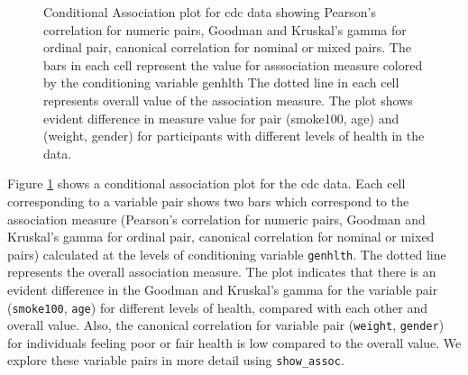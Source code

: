 \begin{Schunk}
\begin{figure}
\caption[Conditional Association plot for cdc data showing Pearson's correlation for numeric pairs, Goodman and Kruskal's gamma for ordinal pair, canonical correlation for nominal or mixed pairs]{Conditional Association plot for cdc data showing Pearson's correlation for numeric pairs, Goodman and Kruskal's gamma for ordinal pair, canonical correlation for nominal or mixed pairs. The bars in each cell represent the value for asssociation measure colored by the conditioning variable genhlth The dotted line in each cell represents overall value of the association measure. The plot shows evident difference in measure value for pair (smoke100, age) and (weight, gender) for participants with different levels of health in the data.}\label{fig:cond-assoc}
\end{figure}
\end{Schunk}

Figure \ref{fig:cond-assoc} shows a conditional association plot for the
cdc data. Each cell corresponding to a variable pair shows two bars
which correspond to the association measure (Pearson's correlation for
numeric pairs, Goodman and Kruskal's gamma for ordinal pair, canonical
correlation for nominal or mixed pairs) calculated at the levels of
conditioning variable \texttt{genhlth}. The dotted line represents the
overall association measure. The plot indicates that there is an evident
difference in the Goodman and Kruskal's gamma for the variable pair
(\texttt{smoke100}, \texttt{age}) for different levels of health,
compared with each other and overall value. Also, the canonical
correlation for variable pair (\texttt{weight}, \texttt{gender}) for
individuals feeling poor or fair health is low compared to the overall
value. We explore these variable pairs in more detail using
\texttt{show\_assoc}.

